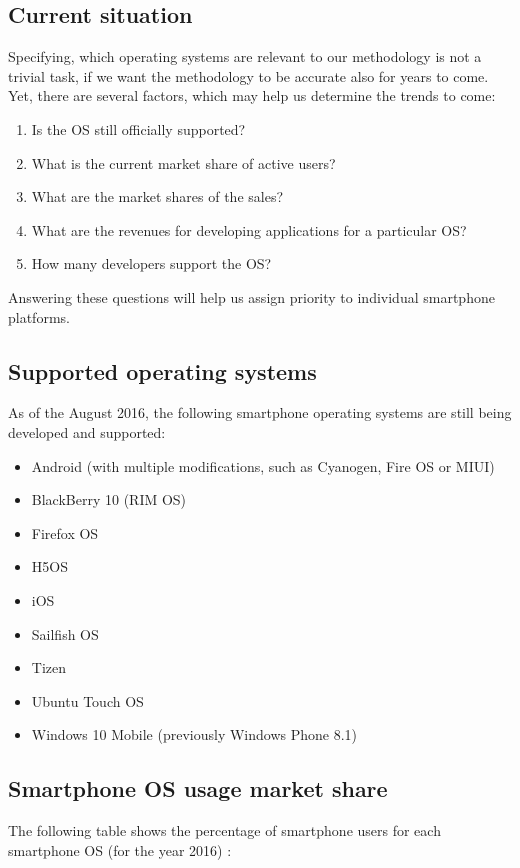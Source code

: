 \documentclass[english,master,public,dept460,male,cpdeclaration,oneside]{diploma}
\begin{document}
\subsection{Current situation}
Specifying, which operating systems are relevant to our methodology is not a trivial task, if we want the methodology to be accurate also for years to come. Yet, there are several factors, which may help us determine the trends to come:
\begin{enumerate}
	\item Is the OS still officially supported?
	\item What is the current market share of active users?
	\item What are the market shares of the sales?
	\item What are the revenues for developing applications for a particular OS?
	\item How many developers support the OS?
\end{enumerate}
Answering these questions will help us assign priority to individual smartphone platforms. 

\subsection{Supported operating systems}
As of the August 2016, the following smartphone operating systems are still being developed and supported: 
\begin{itemize}
	\item Android (with multiple modifications, such as Cyanogen, Fire OS or MIUI)
	\item BlackBerry 10 (RIM OS)
	\item Firefox OS
	\item H5OS
	\item iOS
	\item Sailfish OS
	\item Tizen
	\item Ubuntu Touch OS
	\item Windows 10 Mobile (previously Windows Phone 8.1)
\end{itemize}

\subsection{Smartphone OS usage market share}
The following table shows the percentage of smartphone users for each smartphone OS (for the year 2016) \cite{mosMarketShare}:
\end{document}
